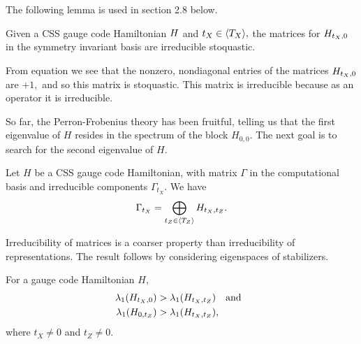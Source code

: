 



The following lemma is used in section 2.8 below.

Given a 
CSS gauge code Hamiltonian $H$ and
$t_X\in \langle T_X \rangle,$
the matrices for $H_{t_X,0}$ 
in the symmetry invariant basis 
are irreducible stoquastic.

\doproof
From equation  we see that 
the nonzero, nondiagonal entries of the matrices
$H_{t_X,0}$ are $+1,$ and so this matrix is stoquastic.
This matrix is irreducible because as an operator it is
irreducible.
\tombstone

So far, the Perron-Frobenius theory has been fruitful,
telling us that the first eigenvalue of $H$ resides in
the spectrum of the block $H_{0,0}$.
The next goal is to search for
the second eigenvalue of $H$.


Let $H$ be a CSS gauge code Hamiltonian,
with matrix $\Gamma$ in the computational basis 
and irreducible components $\Gamma_{t_X}$.
We have
$$
    \Gamma_{t_X} = \bigoplus_{t_Z\in\langle T_Z \rangle}
        H_{t_X,t_Z}.
$$

\doproof
Irreducibility of matrices is a coarser property than irreducibility of 
representations. 
The result follows by considering eigenspaces of stabilizers.
\tombstone

For a gauge code Hamiltonian $H$,
\begin{align*}
\lambda_1(H_{t_X,0}) &> 
    \lambda_1(H_{t_X,t_Z}) \ \ \ \mbox{and}\ \ \\
\lambda_1(H_{0,t_Z}) &> 
    \lambda_1(H_{t_X,t_Z}),
\end{align*}
where $t_X\ne 0$ and $t_Z\ne 0.$

